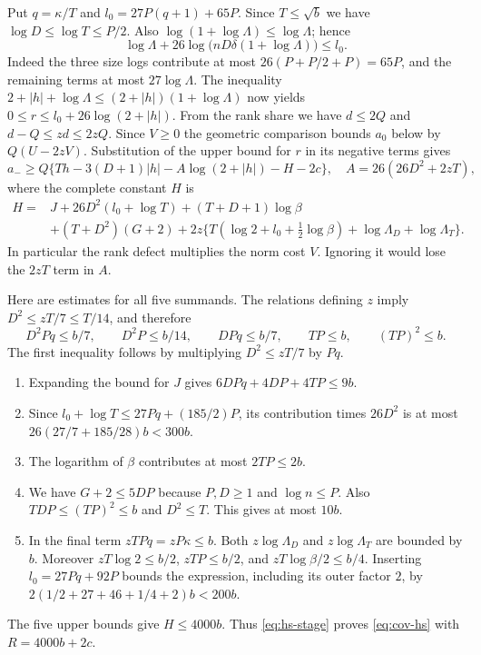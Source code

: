 Put \(q=\kappa/T\) and \(l_0=27P(q+1)+65P\). Since \(T\le\sqrt b\)
we have \(\log D\le\log T\le P/2\). Also
\(\log(1+\log\Lambda)\le\log\Lambda\); hence
\[
 \log\Lambda+26\log\big(nD\delta(1+\log\Lambda)\big)\le l_0 .
\]
Indeed the three size logs contribute at most
\(26(P+P/2+P)=65P\), and the remaining terms at most
\(27\log\Lambda\). The inequality
\(2+|h|+\log\Lambda\le(2+|h|)(1+\log\Lambda)\) now yields
\(0\le r\le l_0+26\log(2+|h|)\).
From the rank share we have \(d\le2Q\) and \(d-Q\le zd\le2zQ\).
Since \(V\ge0\) the geometric comparison bounds \(a_0\) below by
\(Q(U-2zV)\). Substitution of the upper bound for \(r\) in its
negative terms gives
\begin{equation}
 a_-\ge Q\{Th-3(D+1)|h|-A\log(2+|h|)-H-2c\},\quad
       A=26(26D^2+2zT),                         \label{eq:hs-stage}
\end{equation}
where the complete constant \(H\) is
\begin{align*}
 H={}&J+26D^2(l_0+\log T)+(T+D+1)\log\beta\\
     &+(T+D^2)(G+2)
       +2z\{T(\log2+l_0+\tfrac12\log\beta)+\log\Lambda_D+\log\Lambda_T\}.
\end{align*}
In particular the rank defect multiplies the norm cost \(V\). Ignoring
it would lose the \(2zT\) term in \(A\).

Here are estimates for all five summands. The relations defining \(z\)
imply \(D^2\le zT/7\le T/14\), and therefore
\[
 D^2Pq\le b/7,\qquad D^2P\le b/14,\qquad
 DPq\le b/7,\qquad TP\le b,\qquad (TP)^2\le b .
\]
The first inequality follows by multiplying \(D^2\le zT/7\) by \(Pq\).
\begin{enumerate}
\item Expanding the bound for \(J\) gives \(6DPq+4DP+4TP\le9b\).
\item Since \(l_0+\log T\le27Pq+(185/2)P\), its contribution times
\(26D^2\) is at most \(26(27/7+185/28)b<300b\).
\item The logarithm of \(\beta\) contributes at most \(2TP\le2b\).
\item We have \(G+2\le5DP\) because \(P,D\ge1\) and \(\log n\le P\).
Also \(TD P\le (TP)^2\le b\) and \(D^2\le T\).
This gives at most \(10b\).
\item In the final term \(zTPq=zP\kappa\le b\). Both \(z\log\Lambda_D\)
and \(z\log\Lambda_T\) are bounded by \(b\). Moreover
\(zT\log2\le b/2\), \(zTP\le b/2\), and \(zT\log\beta/2\le b/4\).
Inserting \(l_0=27Pq+92P\) bounds the expression, including its
outer factor \(2\), by \(2(1/2+27+46+1/4+2)b<200b\).
\end{enumerate}
The five upper bounds give \(H\le4000b\).
Thus \eqref{eq:hs-stage} proves \eqref{eq:cov-hs}
with \(R=4000b+2c\).

